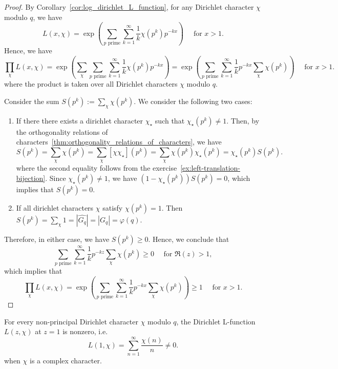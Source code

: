 \documentclass{elegantbook}
\begin{document}
\begin{proof}
  By Corollary~\ref{cor:log_dirichlet_L_function}, for any Dirichlet character \(\chi\) modulo \(q\), we have
  \[
    L(x,\chi) = \exp\left( \sum_{p \text{ prime}} \sum_{k=1}^{\infty} \frac{1}{k} \chi(p^k) p^{-kx} \right) \quad \text{ for } x > 1.
  \]
  Hence, we have
  \[
    \prod_{\chi} L(x,\chi) = \exp\left( \sum_{\chi} \sum_{p \text{ prime}} \sum_{k=1}^{\infty} \frac{1}{k} \chi(p^k) p^{-kx} \right) = \exp\left( \sum_{p \text{ prime}} \sum_{k=1}^{\infty} \frac{1}{k} p^{-kx} \sum_{\chi} \chi(p^k) \right) \quad \text{ for } x > 1.
  \]
  where the product is taken over all Dirichlet characters \(\chi\) modulo \(q\).

  Consider the sum \(S(p^k) := \sum_{\chi} \chi(p^k)\). We consider the following two cases:
  \begin{enumerate}[label=(\textbf{Case \arabic*}),leftmargin=43pt]
    \item If there there exists a dirichlet character \(\chi_{\star} \) such that \(\chi_{\star}(p^k) \ne 1\). Then, by the orthogonality relations of characters~\ref{thm:orthogonality_relations_of_characters}, we have
    \[
      S(p^k) = \sum_{\chi} \chi(p^k) = \sum_{\chi} [\chi\chi_{\star}](p^k) = \sum_{\chi} \chi(p^k) \chi_{\star}(p^k) = \chi_{\star}(p^k) S(p^k).
    \]
    where the second equality follows from the exercise~\ref{ex:left-translation-bijection}.
    Since \(\chi_{\star}(p^k) \ne 1\), we have \( (1 - \chi_{\star}(p^k)) S(p^k) = 0\), which implies that \(S(p^k) = 0\).
    \item If all dirichlet characters \(\chi\) satisfy \(\chi(p^k) = 1\). Then \( S(p^k) = \sum_{\chi} 1 = |\widehat{G_q}| = |G_q| = \varphi(q) \).
  \end{enumerate}
  Therefore, in either case, we have \(S(p^k) \geq 0\). Hence, we conclude that
  \[
    \sum_{p \text{ prime}} \sum_{k=1}^{\infty} \frac{1}{k} p^{-kz} \sum_{\chi} \chi(p^k) \geq 0 \quad \text{ for } \Re(z) > 1,
  \]
  which implies that
  \[
    \prod_{\chi} L(x,\chi) = \exp\left( \sum_{p \text{ prime}} \sum_{k=1}^{\infty} \frac{1}{k} p^{-kx} \sum_{\chi} \chi(p^k) \right) \geq 1 \quad \text{ for } x > 1.
  \]
\end{proof}





\begin{lemma} \label{lem:Dirichlet_L_function_non_vanishing_at_1_for_complex_characters}
  For every non-principal Dirichlet character \(\chi\) modulo \(q\), the Dirichlet L-function \(L(z,\chi)\) at \(z=1\) is nonzero, i.e.
  \[
    L(1,\chi) = \sum_{n=1}^{\infty} \frac{\chi(n)}{n} \ne 0.
  \]
  when \(\chi\) is a complex character.
\end{lemma}
\end{document}
